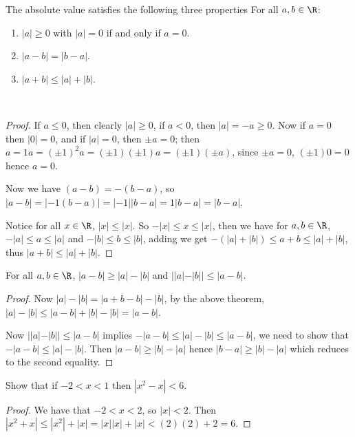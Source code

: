 \begin{theorem}
  The absolute value satisfies the following three properties For all $a,b \in \R$:
      \begin{enumerate}[label=(\arabic*)]
        \item $|a| \geq 0$ with $|a|=0$ if and only if $a=0$.

        \item $|a-b|=|b-a|$.

        \item $|a+b| \leq |a|+|b|$.
      \end{enumerate}
\end{theorem}\
\begin{proof}
  If $a \leq 0$, then clearly $|a| \geq 0$, if $a<0$, then $|a|=-a \geq 0$. Now if $a=0$ then $|0|=0$, and if $|a|=0$, then 
  $\pm a=0$; then $a=1a=(\pm 1)^2a=(\pm 1)(\pm 1)a=(\pm 1)(\pm a)$, since $\pm a=0$, $(\pm 1)0=0$ hence $a=0$.

  Now we have $(a-b)=-(b-a)$, so $|a-b|=|-1(b-a)|=|-1||b-a|=1|b-a|=|b-a|$.

  Notice for all $x \in \R$, $|x| \leq |x|$. So $-|x| \leq x \leq |x|$, then we have for $a,b \in \R$, $-|a| \leq a \leq |a|$ 
  and $-|b| \leq b \leq |b|$, adding we get $-(|a|+|b|) \leq a+b \leq |a|+|b|$, thus $|a+b| \leq |a|+|b|$.
\end{proof}

\begin{corollary}
  For all $a,b \in \R$, $|a-b| \geq |a|-|b|$ and $||a|-|b|| \leq |a-b|$.
\end{corollary}
\begin{proof}
  Now $|a|-|b|=|a+b-b|-|b|$, by the above theorem, $|a|-|b| \leq |a-b|+|b|-|b|=|a-b|$.

  Now $||a|-|b|| \leq |a-b|$ implies $-|a-b| \leq |a|-|b| \leq |a-b|$, we need to show that $-|a-b| \leq |a|-|b|$. Then 
  $|a-b| \geq |b|-|a|$  hence $|b-a| \geq |b|-|a|$ which reduces to the second equality.
\end{proof}


\begin{example}
  Show that if $-2<x<1$ then $|x^2-x|<6$.
\end{example}
\begin{proof}
  We have that $-2<x<2$, so $|x|<2$. Then $|x^2+x| \leq |x^2|+|x|=|x||x|+|x|<(2)(2)+2=6$.
\end{proof}

